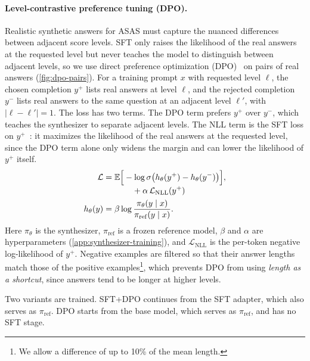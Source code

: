 \paragraph{Level-contrastive preference tuning (DPO).}
Realistic synthetic answers for ASAS must capture the nuanced differences between adjacent score levels. SFT only raises the likelihood of the real answers at the requested level but never teaches the model to distinguish between adjacent levels, so we use direct preference optimization (DPO)~\citep{rafailovDirectPreferenceOptimization2023} on pairs of real answers (\autoref{fig:dpo-pairs}). For a training prompt $x$ with requested level $\ell$, the chosen completion $y^{+}$ lists real answers at level $\ell$, and the rejected completion $y^{-}$ lists real answers to the same question at an adjacent level $\ell'$, with $|\ell - \ell'| = 1$. The loss has two terms. The DPO term prefers $y^{+}$ over $y^{-}$, which teaches the synthesizer to separate adjacent levels. The NLL term is the SFT loss on $y^{+}$~\citep{pangIterativeReasoningPreference2024}: it maximizes the likelihood of the real answers at the requested level, since the DPO term alone only widens the margin and can lower the likelihood of $y^{+}$ itself.
\begin{align}
\mathcal{L} &= \mathbb{E}\Bigl[\begin{aligned}[t]
  &-\log \sigma\bigl(h_\theta(y^{+}) - h_\theta(y^{-})\bigr) \\
  &\quad + \alpha\,\mathcal{L}_{\mathrm{NLL}}(y^{+})
\end{aligned}\Bigr], \label{eq:dpo} \\
h_\theta(y) &= \beta \log \frac{\pi_\theta(y \mid x)}{\pi_{\mathrm{ref}}(y \mid x)}. \notag
\end{align}
Here $\pi_\theta$ is the synthesizer, $\pi_{\mathrm{ref}}$ is a frozen reference model, $\beta$ and $\alpha$ are hyperparameters (\autoref{app:synthesizer-training}), and $\mathcal{L}_{\mathrm{NLL}}$ is the per-token negative log-likelihood of $y^{+}$. Negative examples are filtered so that their answer lengths match those of the positive examples\footnote{We allow a difference of up to 10\% of the mean length.}, which prevents DPO from using 
\textit{length as a shortcut}, since answers tend to be longer at higher levels.



Two variants are trained. SFT+DPO continues from the SFT adapter, which also serves as $\pi_{\mathrm{ref}}$. DPO starts from the base model, which serves as $\pi_{\mathrm{ref}}$, and has no SFT stage.

